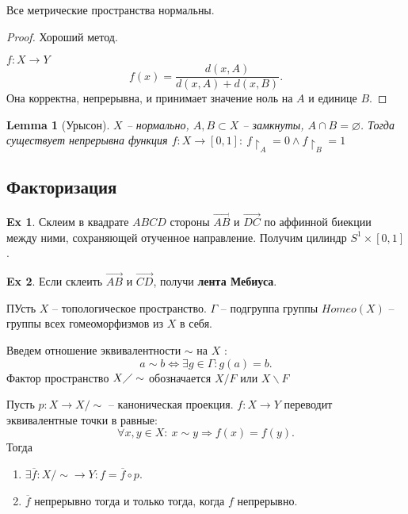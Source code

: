 \documentclass[11pt]{book}
\theoremstyle{definition}
\theoremstyle{plain}
\theoremstyle{plain}
\newtheorem*{lm}{Lemma}
\theoremstyle{definition}
\newtheorem*{ex}{Ex}
\theoremstyle{remark}
\begin{document}
\begin{defn}
    Все метрические пространства нормальны.
\end{defn}
\begin{proof}
    Хороший метод.

    $ f: X \to  Y$
    \[
	f(x) = \frac{d(x, A)}{d(x, A) + d(x, B)}
    .\] 
    Она корректна, непрерывна, и принимает значение ноль на $ A$  и  единице $ B$.
\end{proof}
\begin{lm}[Урысон]
    $ X$ -- нормально, $ A, B \subset  X$ -- замкнуты, $ A \cap  B = \varnothing$. Тогда существует непрерывна функция $ f: X \to  [0, 1]: ~ f\upharpoonright_A = 0 \wedge f\upharpoonright_B = 1$
    
\end{lm}
\subsection{Факторизация}
\begin{ex}
    Склеим в квадрате $ ABCD$ стороны  $ \vec{AB}$ и $ \vec{DC}$ по аффинной биекции между ними, сохраняющей отученное направление. Получим цилиндр $ S^{1} \times [0, 1]$.
\end{ex}
\begin{ex}
    Если склеить $ \vec{AB}$ и $ \vec{CD}$, получи  { \bf лента Мебиуса}.
\end{ex}
\begin{defn}
    ПУсть $ X $ -- топологическое пространство. $ \Gamma$ -- подгруппа группы $ Homeo(X)$ -- группы всех гомеоморфизмов из $ X$ в себя.

    Введем отношение эквивалентности $ \sim $ на $ X$ :
    \[
	a \sim b \Longleftrightarrow \exists  g \in  \Gamma : g(a) = b
    .\] 
    Фактор пространство $ X \diagup \sim $  обозначается $ X / F$ или $ X \backslash F$
\end{defn}
\begin{thm}
    Пусть $ p : X \to  X / \sim $ -- каноническая проекция. $ f: X \to  Y$ переводит эквивалентные точки в равные:
    \[
	\forall  x, y \in  X: ~ x \sim y \Longrightarrow f(x) = f(y)
    .\] 
    Тогда
    \begin{enumerate}
        \item $ \exists  \overline{f}: X / \sim  \to  Y: f = \overline{f} \circ p$.
	    \item  $ \overline{f}$ непрерывно тогда и только тогда, когда  $ f$ непрерывно.
    \end{enumerate}
\end{thm}
\end{document}
